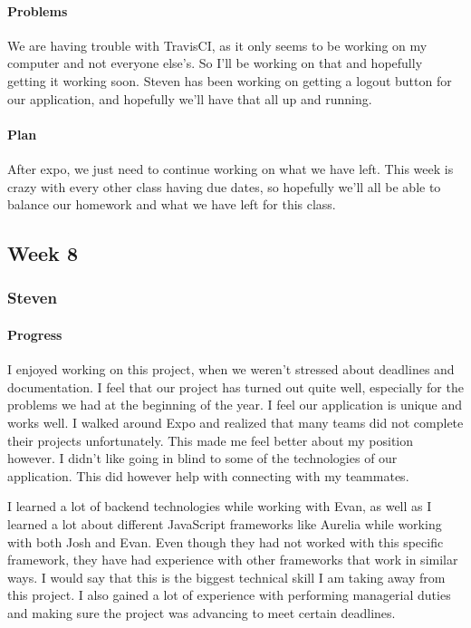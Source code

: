 \documentclass[onecolumn, draftclsnofoot,10pt, compsoc]{IEEEtran}
\begin{document}
	\paragraph{Problems}
	We are having trouble with TravisCI, as it only seems to be working on my computer and not everyone else's. So I'll be working on that and hopefully getting it working soon. Steven has been working on getting a logout button for our application, and hopefully we'll have that all up and running. 
	\paragraph{Plan}
	After expo, we just need to continue working on what we have left. This week is crazy with every other class having due dates, so hopefully we'll all be able to balance our homework and what we have left for this class. 
\subsection{Week 8}
	\subsubsection{Steven}
	
	\paragraph{Progress}
	I enjoyed working on this project, when we weren't stressed about deadlines and documentation. I feel that our project has turned out quite well, especially for the problems we had at the beginning of the year. I feel our application is unique and works well. I walked around Expo and realized that many teams did not complete their projects unfortunately. This made me feel better about my position however. I didn't like going in blind to some of the technologies of our application. This did however help with connecting with my teammates. 
	
	I learned a lot of backend technologies while working with Evan, as well as I learned a lot about different JavaScript frameworks like Aurelia while working with both Josh and Evan. Even though they had not worked with this specific framework, they have had experience with other frameworks that work in similar ways. I would say that this is the biggest technical skill I am taking away from this project. I also gained a lot of experience with performing managerial duties and making sure the project was advancing to meet certain deadlines.
	
\end{document}
